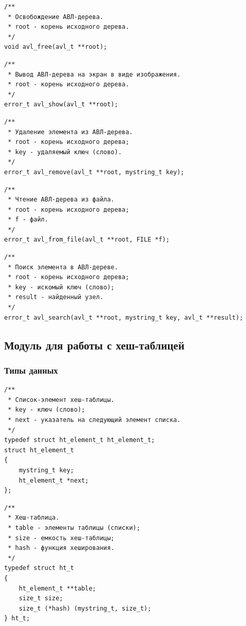 \documentclass[a4paper,12pt]{extarticle}
\begin{document}
\begin{verbatim}
/**
 * Освобождение АВЛ-дерева.
 * root - корень исходного дерева.
 */
void avl_free(avl_t **root);
\end{verbatim}


\begin{verbatim}
/**
 * Вывод АВЛ-дерева на экран в виде изображения.
 * root - корень исходного дерева.
 */
error_t avl_show(avl_t **root);
\end{verbatim}


\begin{verbatim}
/**
 * Удаление элемента из АВЛ-дерева.
 * root - корень исходного дерева;
 * key - удаляемый ключ (слово).
 */
error_t avl_remove(avl_t **root, mystring_t key);
\end{verbatim}


\begin{verbatim}
/**
 * Чтение АВЛ-дерева из файла.
 * root - корень исходного дерева;
 * f - файл.
 */
error_t avl_from_file(avl_t **root, FILE *f);
\end{verbatim}


\begin{verbatim}
/**
 * Поиск элемента в АВЛ-дереве.
 * root - корень исходного дерева;
 * key - искомый ключ (слово);
 * result - найденный узел.
 */
error_t avl_search(avl_t **root, mystring_t key, avl_t **result);
\end{verbatim}


\subsection{Модуль для работы с хеш-таблицей}

\subsubsection{Типы данных}

\begin{verbatim}
/**
 * Список-элемент хеш-таблицы.
 * key - ключ (слово);
 * next - указатель на следующий элемент списка.
 */
typedef struct ht_element_t ht_element_t;
struct ht_element_t
{
    mystring_t key;
    ht_element_t *next;
};
\end{verbatim}

\begin{verbatim}
/**
 * Хеш-таблица.
 * table - элементы таблицы (списки);
 * size - емкость хеш-таблицы;
 * hash - функция хеширования.
 */
typedef struct ht_t
{
    ht_element_t **table;
    size_t size;
    size_t (*hash) (mystring_t, size_t);
} ht_t;
\end{verbatim}
\end{document}
